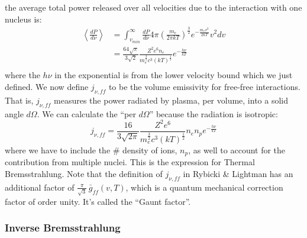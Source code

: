 \documentclass{article}
\def\hf{\frac12}
\def\mean#1{\left\langle {#1}\right\rangle}
\def\hf{\frac12}
\begin{document}
the average total power released over all velocities due to the interaction with one nucleus is:
$$\begin{aligned}\mean{\frac{dP}{ d\nu}}&=\int_{v_{min}}^\infty{\frac{dP}{ d\nu}4\pi
\left(\frac{m_e}{2\pi kT}\right)^\frac{3}{2}e^{-\frac{m_ev^2}{2kT}}v^2dv}\\ 
&=\frac{64\sqrt{\pi}}{3\sqrt{2}}\frac{Z^2e^6n_e}{ m_e^\frac{3}{2}c^3(kT)^\hf}
e^{-\frac{h\nu}{ kT}}\\ \end{aligned}$$
where the $h\nu$ in the exponential is from the lower velocity bound which we just defined.
\def\jnff{j_{\nu,ff}}
We now define $\jnff$ to be the volume emissivity for free-free interactions.
That is, $\jnff$ measures the power radiated by plasma, per volume, into
a solid angle $d\Omega$.  We can calculate the ``per $d\Omega$'' because the
radiation is isotropic:
$$\boxed{\jnff=\frac{16}{3\sqrt{2\pi}}\frac{Z^2e^6}{ m_e^\frac{3}{2}c^3(kT)^\hf}
n_en_pe^{-\frac{h\nu}{ kT}}}$$
where we have to include the \# density of ions, $n_p$, as well to account for the contribution from multiple nuclei.  This is the expression for
Thermal Bremsstrahlung.  Note that the definition of $\jnff$ in Rybicki \&
Lightman has an additional factor of $\frac{\pi}{\sqrt{3}}\,\bar{g}_{ff}(v,T)$, which
is a quantum mechanical correction factor of order unity.  It's called the
``Gaunt factor''.

\subsubsection{ Inverse Bremsstrahlung}
\end{document}
